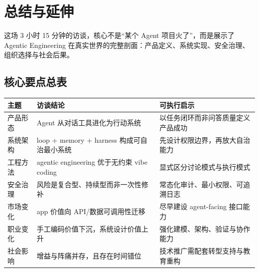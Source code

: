 \section{总结与延伸}

这场 3 小时 15 分钟的访谈，核心不是“某个 Agent 项目火了”，而是展示了 Agentic Engineering 在真实世界的完整剖面：产品定义、系统实现、安全治理、组织选择与社会后果。

\subsection{核心要点总表}
\begin{longtable}{p{}p{}p{}}
\toprule
\textbf{主题} & \textbf{访谈结论} & \textbf{可执行启示} \\
\midrule
产品形态 & Agent 从对话工具进化为行动系统 & 以任务闭环而非问答质量定义产品成功 \\
\midrule
系统架构 & loop + memory + harness 构成可自治最小系统 & 先设计权限边界，再放大自治能力 \\
\midrule
工程方法 & agentic engineering 优于无约束 vibe coding & 显式区分讨论模式与执行模式 \\
\midrule
安全治理 & 风险是复合型、持续型而非一次性修补 & 常态化审计、最小权限、可追溯日志 \\
\midrule
市场变化 & app 价值向 API/数据可调用性迁移 & 尽早建设 agent-facing 接口能力 \\
\midrule
职业变化 & 手工编码价值下沉，系统设计价值上升 & 强化建模、架构、验证与协作能力 \\
\midrule
社会影响 & 增益与阵痛并存，且存在时间错位 & 技术推广需配套转型支持与教育重构 \\
\bottomrule
\end{longtable}

